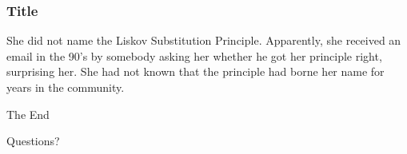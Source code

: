 \documentclass{beamer}
\begin{document}
\begin{frame}
\frametitle{Title}
She did not name the Liskov Substitution Principle. Apparently, she received an email in the 90’s by somebody asking her whether he got her principle right, surprising her. She had not known that the principle had borne her name for years in the community.
\end{frame}


\begin{frame}
\Huge{\centerline{The End}}
\end{frame}


\begin{frame}
\Huge{\centerline{Questions?}}
\end{frame}

\end{document}
